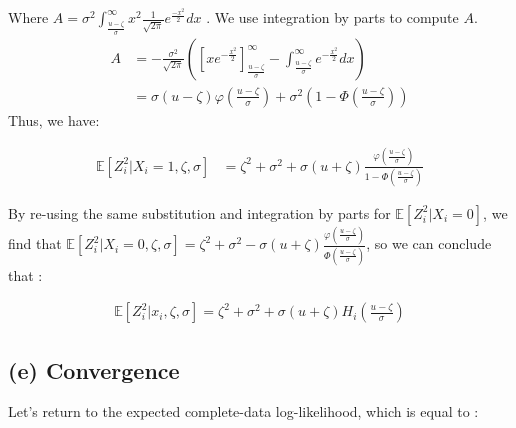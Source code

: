 \documentclass{article}
\begin{document}
Where $A =\sigma^2
\int_{\frac{u-\zeta}{\sigma}}^{\infty} 
x^2
\frac{1}{\sqrt{2\pi}} 
e^{ \frac{-x^2}{2}  } 
dx $ . We use integration by parts to compute $A$. 
\begin{align*}
   A  &= -\frac{\sigma^2}{\sqrt{2\pi}}
            \left (
            \left [
                x e^{-\frac{x^2}{2}}
            \right ]_{\frac{u-\zeta}{\sigma}}^{\infty}
            - 
            \int_{\frac{u-\zeta}{\sigma}}^{\infty}
            e^{-\frac{x^2}{2}} dx
            \right ) \\
        &= \sigma (u-\zeta) 
        \varphi \left (\frac{u-\zeta}{\sigma} \right)
        + \sigma^2 
        (1- \Phi \left (\frac{u-\zeta}{\sigma}\right ) )
\end{align*}
\noindent Thus, we have:

\begin{align*}
    \mathbb{E}[Z_i^2 |X_i = 1, \zeta, \sigma]  &= \zeta^2 
                                + \sigma^2 
                                +\sigma(u+\zeta) 
                                \frac{\varphi \left ( \frac{u-\zeta}{\sigma} \right )}
        {1- \Phi \left (\frac{u-\zeta}{\sigma}\right )}
\end{align*}

By re-using the same substitution and integration by parts for $\mathbb{E}[Z_i^2|X_i=0]$, 
we find that $  \mathbb{E}[Z_i^2 |X_i = 0, \zeta, \sigma]  = \zeta^2 
+ \sigma^2 
-\sigma(u+\zeta) 
\frac{\varphi \left ( \frac{u-\zeta}{\sigma} \right )}
{\Phi \left (\frac{u-\zeta}{\sigma}\right )}$, so we can conclude that :

\begin{align*}
    \mathbb{E}[Z_i^2 |x_i, \zeta, \sigma] = \zeta^2 
    + \sigma^2 
    +\sigma(u+\zeta) H_i\left (  \frac{u-\zeta}{\sigma}   \right )
\end{align*}

\subsection*{(e) Convergence }

Let's return to the expected complete-data log-likelihood, which is equal to  : 
\end{document}
